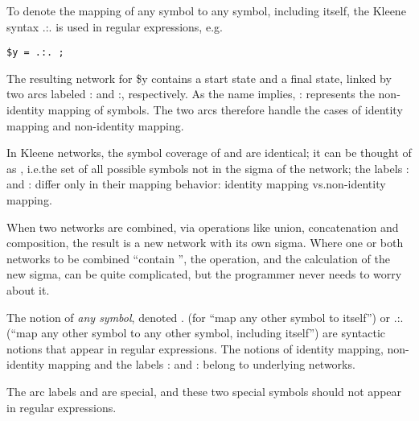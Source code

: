 To denote the mapping of any symbol to any symbol, including itself, the
Kleene syntax .:. is used in regular expressions, e.g.

\begin{Verbatim}[fontsize=\small]
$y = .:. ;
\end{Verbatim}

\noindent
The resulting network for \$y contains a start state and a final state,
linked by two arcs labeled : and
:, respectively.  As the name
implies, : represents the
non-identity mapping of  symbols.  The two arcs therefore
handle the cases of identity mapping and non-identity mapping.

In Kleene networks, the symbol coverage of  and
 are identical; it can be thought of as ,
i.e.\@ the set of all possible symbols not in the sigma of the network;
the labels : and
: differ only in their mapping
behavior: identity mapping vs.\@ non-identity mapping.

When two networks are combined, via operations like union, concatenation
and composition, the result is a new network with its own sigma.  Where
one or both networks to be combined ``contain '', the
operation, and the calculation of the new sigma, can be quite
complicated, but the programmer never needs to worry about it.

The notion of \emph{any symbol}, denoted . (for ``map any other symbol to
itself'') or .:. (``map any other symbol to any other symbol, including
itself'') are syntactic notions that appear in regular expressions.  The
notions of identity mapping, non-identity mapping and the labels
: and
: belong to underlying networks.  

The arc labels  and  are special, and
these two special symbols should not appear in regular expressions.


